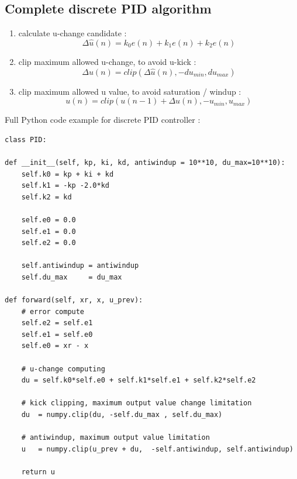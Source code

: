 \documentclass[12pt,twoside,onecolumn,openany,extrafontsizes,dvipsnames]{memoir}
\begin{document}
                \newpage
                \subsection{Complete discrete PID algorithm}  
        
                    \begin{enumerate}
                        \item  calculate u-change candidate :
                            $$\Delta \hat{u}(n) = k_0e(n) + k_1e(n) + k_2e(n)$$
                        
                        \item clip maximum allowed u-change, to avoid u-kick :
                            $$\Delta u(n) = clip(\Delta \hat{u}(n), -du_{min}, du_{max})$$
                    
                        \item clip maximum allowed u value, to avoid saturation / windup :
                            $$u(n) = clip(u(n-1) + \Delta u(n), -u_{min}, u_{max})$$
                    \end{enumerate}

                    Full Python code example for discrete PID controller :
                    \begin{lstlisting}[style=python_style]
class PID:

def __init__(self, kp, ki, kd, antiwindup = 10**10, du_max=10**10):
    self.k0 = kp + ki + kd
    self.k1 = -kp -2.0*kd
    self.k2 = kd

    self.e0 = 0.0
    self.e1 = 0.0
    self.e2 = 0.0
    
    self.antiwindup = antiwindup
    self.du_max     = du_max

def forward(self, xr, x, u_prev):
    # error compute
    self.e2 = self.e1
    self.e1 = self.e0
    self.e0 = xr - x

    # u-change computing
    du = self.k0*self.e0 + self.k1*self.e1 + self.k2*self.e2

    # kick clipping, maximum output value change limitation
    du  = numpy.clip(du, -self.du_max , self.du_max)

    # antiwindup, maximum output value limitation
    u   = numpy.clip(u_prev + du,  -self.antiwindup, self.antiwindup)

    return u
                    \end{lstlisting}
\end{document}
